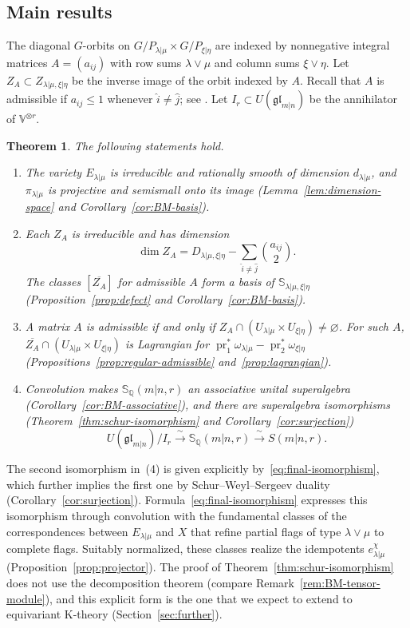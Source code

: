 \documentclass[11pt,a4paper]{amsart}
\newtheorem{introthm}{Theorem}
\theoremstyle{definition}
\theoremstyle{remark}
\newcommand{\Q}{\mathbb Q}
\newcommand{\bS}{\mathbb S}
\newcommand{\pr}{\operatorname{pr}}
\newcommand{\lm}{\lambda|\mu}
\newcommand{\xh}{\xi|\eta}
\numberwithin{equation}{section}
\begin{document}
\subsection{Main results}
The diagonal $G$-orbits on $G/P_{\lm}\times G/P_{\xh}$ are indexed
by nonnegative integral matrices $A=(a_{ij})$ with row sums
$\lambda\vee\mu$ and column sums $\xi\vee\eta$. Let
$Z_A\subset Z_{\lm,\xh}$ be the inverse image of the orbit indexed
by $A$. Recall that $A$ is admissible if $a_{ij}\leq1$ whenever
$\widehat i\ne\widehat j$; see \cite[(3.0.1)]{DuRui}. Let
$I_r\subset U(\mathfrak{gl}_{m|n})$ be the annihilator of
$\mathbb V^{\otimes r}$.

\begin{introthm}\label{thm:main}
The following statements hold.
\begin{enumerate}
\item The variety $E_{\lm}$ is irreducible and rationally smooth of
dimension $d_{\lm}$, and $\pi_{\lm}$ is projective and semismall
onto its image (Lemma~\ref{lem:dimension-space} and Corollary~\ref{cor:BM-basis}).
\item Each $Z_A$ is irreducible and has dimension
$$
\dim Z_A=D_{\lm,\xh}
-\sum_{\widehat i\ne\widehat j}\binom{a_{ij}}2.
$$
The classes $[\overline{Z_A}]$ for admissible $A$ form a basis of
$\bS_{\lm,\xh}$ (Proposition~\ref{prop:defect} and Corollary~\ref{cor:BM-basis}).
\item A matrix $A$ is admissible if and only if
$Z_A\cap(U_{\lm}\times U_{\xh})\ne\varnothing$. For such $A$,
$\overline{Z_A}\cap(U_{\lm}\times U_{\xh})$ is Lagrangian for
$\pr_1^*\omega_{\lm}-\pr_2^*\omega_{\xh}$
(Propositions~\ref{prop:regular-admissible} and~\ref{prop:lagrangian}).
\item Convolution makes $\bS_\Q(m|n,r)$ an associative unital superalgebra
(Corollary~\ref{cor:BM-associative}), and there are superalgebra isomorphisms
(Theorem~\ref{thm:schur-isomorphism} and Corollary~\ref{cor:surjection})
\begin{equation}\label{eq:intro-enveloping-quotient}
U(\mathfrak{gl}_{m|n})/I_r\xrightarrow{\ \sim\ }\bS_\Q(m|n,r)
\xrightarrow{\ \sim\ }S(m|n,r).
\end{equation}
\end{enumerate}
\end{introthm}

The second isomorphism in~(4) is given
explicitly by~\eqref{eq:final-isomorphism}, which further implies the first one by Schur--Weyl--Sergeev duality (Corollary~\ref{cor:surjection}). Formula~\eqref{eq:final-isomorphism} expresses this isomorphism through
convolution with the fundamental classes of the correspondences between
$E_{\lm}$ and $X$ that refine partial flags of type $\lambda\vee\mu$ to
complete flags. Suitably normalized, these classes realize the idempotents
$e^\chi_{\lm}$ (Proposition~\ref{prop:projector}). The proof of
Theorem~\ref{thm:schur-isomorphism} does not use the decomposition theorem
(compare Remark~\ref{rem:BM-tensor-module}), and this explicit form is the
one that we expect to extend to equivariant K-theory
(Section~\ref{sec:further}).
\end{document}
